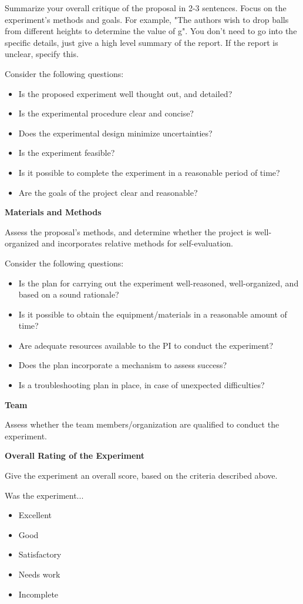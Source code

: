 Summarize your overall critique of the proposal in 2-3 sentences. Focus on the experiment's methods and goals. For example, "The authors wish to drop balls from different heights to determine the value of g". You don't need to go into the specific details, just give a high level summary of the report. If the report is unclear, specify this.

Consider the following questions:
\begin{itemize}
\item Is the proposed experiment well thought out, and detailed?
\item Is the experimental procedure clear and concise?
\item Does the experimental design minimize uncertainties?
\item Is the experiment feasible? 
\item Is it possible to complete the experiment in a reasonable period of time?
\item Are the goals of the project clear and reasonable?
\end{itemize}

\textbf{Materials and Methods}

Assess the proposal's methods, and determine whether the project is well-organized and incorporates relative methods for self-evaluation.

Consider the following questions:
\begin{itemize}
\item Is the plan for carrying out the experiment well-reasoned, well-organized, and based on a sound rationale?
\item Is it possible to obtain the equipment/materials in a reasonable amount of time?
\item Are adequate resources available to the PI to conduct the experiment?
\item Does the plan incorporate a mechanism to assess success?
\item Is a troubleshooting plan in place, in case of unexpected difficulties?
\end{itemize}

\textbf{Team}

Assess whether the team members/organization are qualified to conduct the experiment.

\textbf{Overall Rating of the Experiment}

Give the experiment an overall score, based on the criteria described above.

Was the experiment...
\begin{itemize}
\item Excellent
\item Good
\item Satisfactory
\item Needs work
\item Incomplete
\end{itemize}

